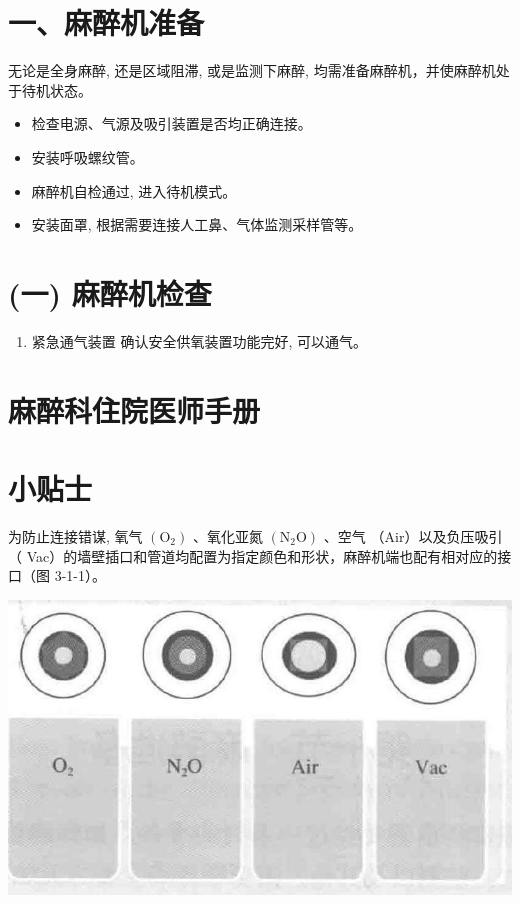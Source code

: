 \documentclass[10pt]{article}
\begin{document}
\section*{一、麻醉机准备}
无论是全身麻醉, 还是区域阻滞, 或是监测下麻醉, 均需准备麻醉机，并使麻醉机处于待机状态。

\begin{itemize}
  \item 检查电源、气源及吸引装置是否均正确连接。
  \item 安装呼吸螺纹管。
  \item 麻醉机自检通过, 进入待机模式。
  \item 安装面罩, 根据需要连接人工鼻、气体监测采样管等。
\end{itemize}

\section*{(一) 麻醉机检查}
\begin{enumerate}
  \item 紧急通气装置 确认安全供氧装置功能完好, 可以通气。
\end{enumerate}

\section*{麻醉科住院医师手册}
\section*{小贴士}
为防止连接错谋, 氧气 $\left(\mathrm{O}_{2}\right)$ 、氧化亚氮 $\left(\mathrm{N}_{2} \mathrm{O}\right)$ 、空气 （Air）以及负压吸引（ Vac）的墙壁插口和管道均配置为指定颜色和形状，麻醉机端也配有相对应的接口（图 3-1-1）。

\begin{center}
\includegraphics[max width=\textwidth]{2024_07_05_645bb794a4d4f32ee0c8g-068(1)}
\end{center}
\end{document}
